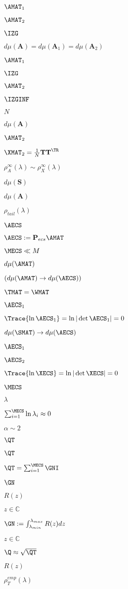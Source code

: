 $\AMAT_{1}$

$\AMAT_{2}$

$\IZG$

$d\mu(\mathbf{A})=d\mu(\mathbf{A}_1)=d\mu(\mathbf{A}_2)$

$\AMAT_1$

$\IZG$

$\AMAT_2$

$\IZGINF$

$N$

$d\mu(\mathbf{A})$

$\AMAT_{2}$

$\XMAT_2=\frac{1}{N}\mathbf{TT}^{\TR}$

$\rho^{\infty}_{A}(\lambda)\sim\rho^{\infty}_{X}(\lambda)$

$d\mu(\mathbf{S})$

$d\mu(\mathbf{A})$

$\rho_{tail}(\lambda)$

$\AECS$

$\AECS:=\mathbf{P}_{ecs}\AMAT$

$\MECS\ll M$

$d\mu(\AMAT)$

$(d\mu(\AMAT)\rightarrow d\mu(\AECS))$

$\TMAT=\WMAT$

$\AECS_1$

$\Trace{\ln\AECS_1}=\ln|\det \AECS_1|=0$

$d\mu(\SMAT) \rightarrow d\mu(\AECS) $

$\AECS_1$

$\AECS_2$

$\Trace{\ln\XECS}=\ln|\det \XECS|=0$

$\MECS$

$\lambda$

$\sum_{i=1}^{\MECS}\ln\lambda_{i}\approx 0$

$\alpha\sim 2$

$\QT$

$\QT$

$\QT = \sum_{i=1}^{\MECS}\GNI$

$\GN$

$R(z)$

$z\in\mathbb{C}$

$\GN:= \int_{\lambda_{min}}^{\lambda_{max}}R(z)dz$

$z\in\mathbb{C}$

$\Q\approx\sqrt{\QT}$

$R(z)$

$\rho^{emp}_{T}(\lambda)$

